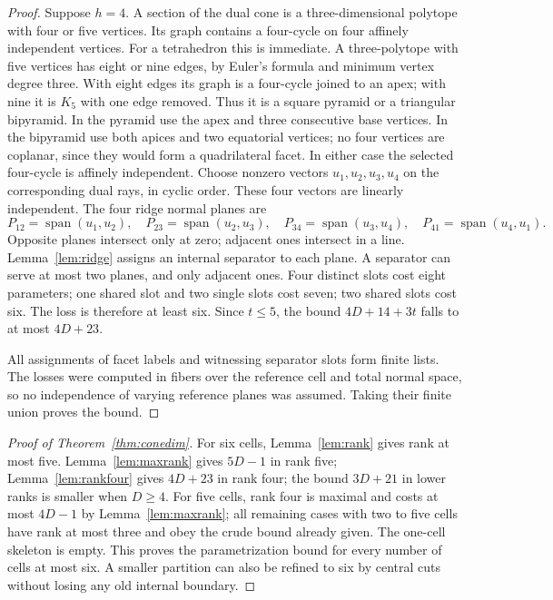 \documentclass[a4paper,11pt,reqno]{amsart}
\newcommand{\spanlin}{\operatorname{span}}
\theoremstyle{definition}
\theoremstyle{remark}
\numberwithin{equation}{section}
\begin{document}
\begin{proof}
Suppose $h=4$. A section of the dual cone is a three-dimensional
polytope with four or five vertices. Its graph contains a four-cycle
on four affinely independent vertices. For a tetrahedron this is
immediate. A three-polytope with five vertices has eight or nine edges, by
Euler's formula and minimum vertex degree three. With eight edges its
graph is a four-cycle joined to an apex; with nine it is $K_5$ with
one edge removed. Thus it is a square pyramid or a triangular
bipyramid. In the pyramid use the apex and three consecutive base
vertices. In the bipyramid use both apices and two equatorial vertices;
no four vertices are coplanar, since they would form a quadrilateral
facet. In either case the selected four-cycle is affinely independent.
Choose nonzero vectors $u_1,u_2,u_3,u_4$ on the corresponding dual
rays, in cyclic order. These four vectors are linearly independent. The four ridge normal planes are
\[
 P_{12}=\spanlin(u_1,u_2),\quad P_{23}=\spanlin(u_2,u_3),\quad
 P_{34}=\spanlin(u_3,u_4),\quad P_{41}=\spanlin(u_4,u_1).
\]
Opposite planes intersect only at zero; adjacent ones intersect in
a line. Lemma~\ref{lem:ridge} assigns an internal separator to each
plane. A separator can serve at most two planes, and only adjacent
ones. Four distinct slots cost eight parameters; one shared slot
and two single slots cost seven; two shared slots cost six. The
loss is therefore at least six. Since $t\le5$, the bound
$4D+14+3t$ falls to at most $4D+23$.

All assignments of facet labels and witnessing separator slots form
finite lists. The losses were computed in fibers over the reference
cell and total normal space, so no independence of varying reference
planes was assumed. Taking their finite union proves the bound.
\end{proof}

\begin{proof}[Proof of Theorem~\ref{thm:conedim}]
For six cells, Lemma~\ref{lem:rank} gives rank at most five.
Lemma~\ref{lem:maxrank} gives $5D-1$ in rank five;
Lemma~\ref{lem:rankfour} gives $4D+23$ in rank four; the bound
$3D+21$ in lower ranks is smaller when $D\ge4$.
For five cells, rank four is maximal and costs at most $4D-1$ by
Lemma~\ref{lem:maxrank}; all remaining cases with two to five cells
have rank at most three and obey the crude bound already given.
The one-cell skeleton is empty. This proves the parametrization
bound for every number of cells at most six. A smaller partition can
also be refined to six by central cuts without losing any old
internal boundary.
\end{proof}
\end{document}
